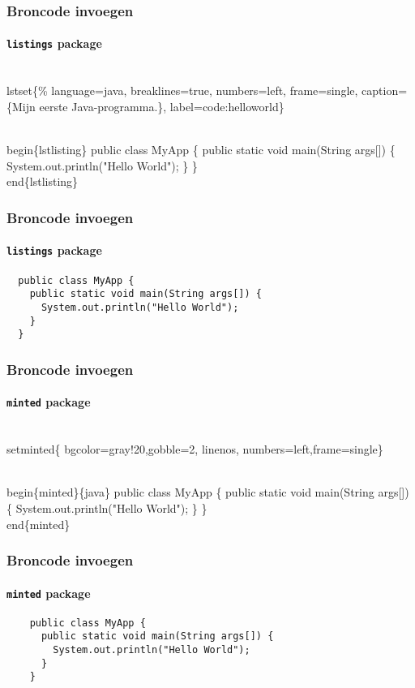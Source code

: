\documentclass[aspectratio=169]{beamer}
\begin{document}
\begin{frame}[fragile]
  \frametitle{Broncode invoegen}
  \framesubtitle{\texttt{listings} package}

\begin{semiverbatim}
\\lstset\{\%
  language=java,  breaklines=true,  numbers=left,
  frame=single, caption=\{Mijn eerste Java-programma.\},
  label=code:helloworld\}

\alert{\\begin\{lstlisting\}}
public class MyApp \{
  public static void main(String args[]) \{
    System.out.println("Hello World");
  \}
\}
\alert{\\end\{lstlisting\}}
\end{semiverbatim}

\end{frame}

\begin{frame}[fragile]
  \frametitle{Broncode invoegen}
  \framesubtitle{\texttt{listings} package}


  \begin{lstlisting}
  public class MyApp {
    public static void main(String args[]) {
      System.out.println("Hello World");
    }
  }
  \end{lstlisting}

\end{frame}

\begin{frame}[fragile]
  \frametitle{Broncode invoegen}
  \framesubtitle{\texttt{minted} package}

\begin{semiverbatim}
\\setminted\{%
  bgcolor=gray!20,gobble=2, linenos,
  numbers=left,frame=single\}

\\begin\{minted\}\{java\}
  public class MyApp \{
    public static void main(String args[]) \{
      System.out.println("Hello World");
    \}
  \}
\\end\{minted\}
\end{semiverbatim}
\end{frame}

\begin{frame}[fragile]
  \frametitle{Broncode invoegen}
  \framesubtitle{\texttt{minted} package}
  \begin{verbatim}
    public class MyApp {
      public static void main(String args[]) {
        System.out.println("Hello World");
      }
    }
  \end{verbatim}
\end{frame}
\end{document}
